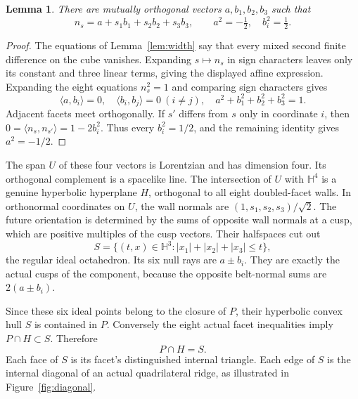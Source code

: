 \documentclass[11pt]{article}
\newtheorem{lemma}[theorem]{Lemma}
\theoremstyle{remark}
\newcommand{\HH}{\mathbb H}
\newcommand{\ip}[2]{\langle #1,#2\rangle}
\begin{document}
\begin{lemma}\label{lem:normal}
There are mutually orthogonal vectors $a,b_1,b_2,b_3$ such that
\[
 n_s=a+s_1b_1+s_2b_2+s_3b_3,\qquad
 a^2=-\tfrac12,\quad b_i^2=\tfrac12.
\]
\end{lemma}
\begin{proof}
The equations of Lemma~\ref{lem:width} say that every mixed second
finite difference on the cube vanishes. Expanding $s\mapsto n_s$
in sign characters leaves only its constant and three linear
terms, giving the displayed affine expression. Expanding the
eight equations $n_s^2=1$ and comparing sign characters gives
\[
 \ip{a}{b_i}=0,\quad \ip{b_i}{b_j}=0\ (i\ne j),\quad
 a^2+b_1^2+b_2^2+b_3^2=1.
\]
Adjacent facets meet orthogonally. If $s'$ differs from $s$ only
in coordinate $i$, then
$0=\ip{n_s}{n_{s'}}=1-2b_i^2$. Thus every $b_i^2=1/2$, and
the remaining identity gives $a^2=-1/2$.
\end{proof}

The span $U$ of these four vectors is Lorentzian and has dimension
four. Its orthogonal complement is a spacelike line. The
intersection of $U$ with $\HH^4$ is a genuine hyperbolic
hyperplane $H$, orthogonal to all eight doubled-facet walls.
In orthonormal coordinates on $U$, the wall normals are
$(1,s_1,s_2,s_3)/\sqrt2$. The future orientation is determined by
the sums of opposite wall normals at a cusp, which are positive multiples of
the cusp vectors. Their halfspaces cut out
\begin{equation}\label{eq:section}
 S=\{(t,x)\in\HH^3:|x_1|+|x_2|+|x_3|\le t\},
\end{equation}
the regular ideal octahedron. Its six null rays are $a\pm b_i$.
They are exactly the actual cusps of the component, because the
opposite belt-normal sums are $2(a\pm b_i)$.

Since these six ideal points belong to the closure of $P$, their
hyperbolic convex hull $S$ is contained in $P$. Conversely the
eight actual facet inequalities imply $P\cap H\subset S$.
Therefore
\[
 P\cap H=S.
\]
Each face of $S$ is its facet's distinguished internal triangle.
Each edge of $S$ is the internal diagonal of an actual
quadrilateral ridge, as illustrated in Figure~\ref{fig:diagonal}.
\end{document}
